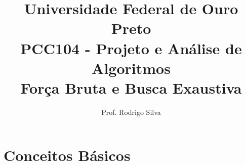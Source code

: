 \documentclass{article}
\title{\vspace{-2 cm}Universidade Federal de Ouro Preto \\ PCC104 - Projeto e Análise de Algoritmos \\ Força Bruta e Busca Exaustiva}
\author{Prof. Rodrigo Silva}
\begin{document}
\maketitle



\section{Conceitos Básicos}
\end{document}
